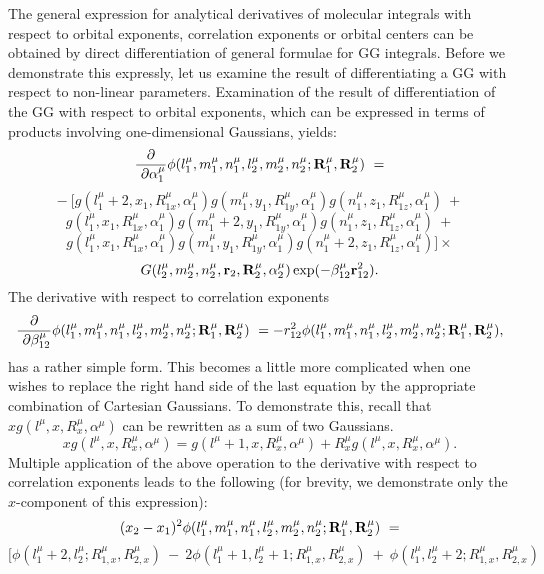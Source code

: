 The general expression for analytical derivatives of molecular integrals
with respect to orbital exponents, correlation exponents or orbital centers
can be obtained by direct differentiation of general formulae for GG
integrals. Before we demonstrate this expressly, let us examine the result
of differentiating a GG with respect to non-linear parameters. Examination
of the result of differentiation of the GG with respect to orbital
exponents, which can be expressed in terms of products involving
one-dimensional Gaussians, yields: 
\[
{\frac{{\partial }}{{\ \partial \alpha _1^\mu }}}\phi (l_1^\mu ,m_1^\mu
,n_1^\mu ,l_2^\mu ,m_2^\mu ,n_2^\mu ;{\bf R}_1^\mu ,{\bf R}_2^\mu )\ =
\]
\[
-\ [g(l_1^\mu +2,x_1,R_{1x}^\mu ,\alpha _1^\mu )g(m_1^\mu ,y_1,R_{1y}^\mu
,\alpha _1^\mu )g(n_1^\mu ,z_1,R_{1z}^\mu ,\alpha _1^\mu )\ +
\]
\[
g(l_1^\mu ,x_1,R_{1x}^\mu ,\alpha _1^\mu )g(m_1^\mu +2,y_1,R_{1y}^\mu
,\alpha _1^\mu )g(n_1^\mu ,z_1,R_{1z}^\mu ,\alpha _1^\mu )\ +
\]
\[
g(l_1^\mu ,x_1,R_{1x}^\mu ,\alpha _1^\mu )g(m_1^\mu ,y_1,R_{1y}^\mu ,\alpha
_1^\mu )g(n_1^\mu +2,z_1,R_{1z}^\mu ,\alpha _1^\mu )]\times 
\]
\begin{equation}
G(l_2^\mu ,m_2^\mu ,n_2^\mu ,{\bf r}_2,{\bf R}_2^\mu ,\alpha _2^\mu )\exp
(-\beta _{12}^\mu {\bf r}_{12}^2).
\end{equation}
The derivative with respect to correlation exponents 
\begin{equation}
{\frac{{\partial }}{{\ \partial \beta _{12}^\mu }}}\phi (l_1^\mu ,m_1^\mu
,n_1^\mu ,l_2^\mu ,m_2^\mu ,n_2^\mu ;{\bf R}_1^\mu ,{\bf R}_2^\mu )\
=-r_{12}^2\phi (l_1^\mu ,m_1^\mu ,n_1^\mu ,l_2^\mu ,m_2^\mu ,n_2^\mu ;{\bf R}%
_1^\mu ,{\bf R}_2^\mu ),
\end{equation}
has a rather simple form. This becomes a little more complicated when one
wishes to replace the right hand side of the last equation by the
appropriate combination of Cartesian Gaussians. To demonstrate this, recall
that $xg(l^\mu ,x,R_x^\mu ,\alpha ^\mu )$ can be rewritten as a sum of two
Gaussians. 
\begin{equation}
xg(l^\mu ,x,R_x^\mu ,\alpha ^\mu )=g(l^\mu +1,x,R_x^\mu ,\alpha ^\mu
)+R_x^\mu g(l^\mu ,x,R_x^\mu ,\alpha ^\mu ).
\end{equation}
Multiple application of the above operation to the derivative with respect
to correlation exponents leads to the following (for brevity, we demonstrate
only the $x$-component of this expression): 
\[
(x_2-x_1)^2\phi (l_1^\mu ,m_1^\mu ,n_1^\mu ,l_2^\mu ,m_2^\mu ,n_2^\mu ;{\bf R%
}_1^\mu ,{\bf R}_2^\mu )\ =
\]
\[
\bigg[
\phi (l_1^\mu +2,l_2^\mu ;R_{1,x}^\mu ,R_{2,x}^\mu )\ -\ 2\phi (l_1^\mu
+1,l_2^\mu +1;R_{1,x}^\mu ,R_{2,x}^\mu )\ +\ \phi (l_1^\mu ,l_2^\mu
+2;R_{1,x}^\mu ,R_{2,x}^\mu )
\]
